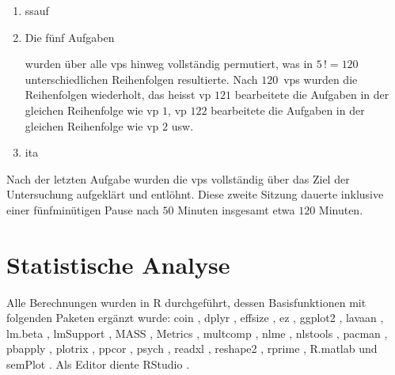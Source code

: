 \documentclass[11pt, twoside, a4paper]{book}		%
\begin{document}
\begin{enumerate}
	\item	\gls{ssauf}
	\item	Die fünf Aufgaben
			wurden über alle \glspl{vp} hinweg vollständig permutiert, was in $5\,! = 120$ unterschiedlichen Reihenfolgen resultierte. Nach $120$~\glspl{vp} wurden die Reihenfolgen wiederholt, das heisst  \gls{vp} $121$ bearbeitete die Aufgaben in der gleichen Reihenfolge wie \gls{vp} $1$, \gls{vp} $122$ bearbeitete die Aufgaben in der gleichen Reihenfolge wie \gls{vp} $2$ usw.
	\item	\gls{ita}
\end{enumerate}

\noindent Nach der letzten Aufgabe wurden die \glspl{vp} vollständig über das Ziel der Untersuchung aufgeklärt und entlöhnt. Diese zweite Sitzung dauerte inklusive einer fünfminütigen Pause nach $50$ Minuten insgesamt etwa $120$ Minuten.




\section{Statistische Analyse \label{sec:StatistischeAnalyse}}

Alle Berechnungen wurden in R \citep{R} durchgeführt, dessen Basisfunktionen mit folgenden Paketen ergänzt wurde:
{coin} \citep{coin},
dplyr \citep{dplyr},
effsize \citep{effsize},
ez \citep{ez},
ggplot2 \citep{ggplot2},
lavaan \citep{lavaan},
lm.beta \citep{lm.beta},
lmSupport \citep{lmSupport},
MASS \citep{MASS},
Metrics \citep{Metrics},		%
multcomp \citep{multcomp},
nlme \citep{nlme},
nlstools \citep{nlstools},
pacman \citep{pacman},
pbapply \citep{pbapply},
plotrix \citep{plotrix},
ppcor \citep{ppcor},
psych \citep{psych},
readxl \citep{readxl},
reshape2 \citep{reshape2},
rprime \citep{rprime},
R.matlab \citep{R.matlab} und
semPlot \citep{semPlot}.
Als Editor diente RStudio \citep{RStudio}.
\end{document}
